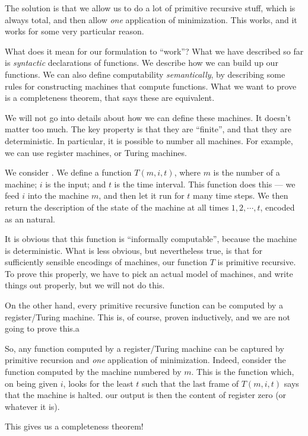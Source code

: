 \documentclass[a4paper]{article}
\begin{document}
The solution is that we allow us to do a lot of primitive recursive stuff, which is always total, and then allow \emph{one} application of minimization. This works, and it works for some very particular reason.

What does it mean for our formulation to ``work''? What we have described so far is \emph{syntactic} declarations of functions. We describe how we can build up our functions. We can also define computability \emph{semantically}, by describing some rules for constructing machines that compute functions. What we want to prove is a completeness theorem, that says these are equivalent.

We will not go into details about how we can define these machines. It doesn't matter too much. The key property is that they are ``finite'', and that they are deterministic. In particular, it is possible to number all machines. For example, we can use register machines, or Turing machines.

We consider . We define a function $T(m, i, t)$, where $m$ is the number of a machine; $i$ is the input; and $t$ is the time interval. This function does this --- we feed $i$ into the machine $m$, and then let it run for $t$ many time steps. We then return the description of the state of the machine at all times $1, 2, \cdots, t$, encoded as an natural.

It is obvious that this function is ``informally computable'', because the machine is deterministic. What is less obvious, but nevertheless true, is that for sufficiently sensible encodings of machines, our function $T$ is primitive recursive. To prove this properly, we have to pick an actual model of machines, and write things out properly, but we will not do this. %

On the other hand, every primitive recursive function can be computed by a register/Turing machine. This is, of course, proven inductively, and we are not going to prove this.a

So, any function computed by a register/Turing machine can be captured by primitive recursion and \emph{one} application of minimization. Indeed, consider the function computed by the machine numbered by $m$. This is the function which, on being given $i$, looks for the least $t$ such that the last frame of $T(m, i, t)$ says that the machine is halted. our output is then the content of register zero (or whatever it is).

This gives us a completeness theorem! %
\end{document}
